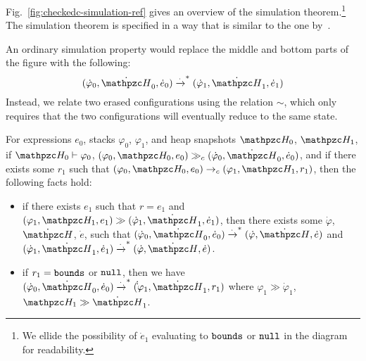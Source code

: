 Fig.~\ref{fig:checkedc-simulation-ref} gives an overview of 
the simulation theorem.\footnote{We ellide the  possibility of $\dot e_1$ evaluating to $\mathtt{bounds}$ or $\mathtt{null}$ in the diagram for readability.} The simulation theorem is specified in a way
that is similar to the one by~\citet{merigoux2021catala}.

An ordinary simulation property would
replace the middle and bottom parts of the figure with the
following: \[(\dot \varphi_0, \dot \heap_0, \dot e_0) 
  \xrightarrow{\cdot}^* (\dot \varphi_1, \dot \heap_1, \dot e_1)\]
Instead, we relate two erased configurations using the relation $\sim$,
which only requires that the two configurations will eventually reduce
to the same state.


\begin{thm}\label{simulation-thm}
For \lang expressions $e_0$, stacks $\varphi_0$, $\varphi_1$, and heap snapshots $\heap_0$, $\heap_1$, 
if $\heap_0 \vdash \varphi_0$, $(\varphi_0,\heap_0,e_0)\gg_c (\dot \varphi_0,\dot \heap_0, \dot e_0)$,
and if there exists some $r_1$ such that $(\varphi_0, \heap_0, e_0)
\rightarrow_c (\varphi_1, \heap_1, r_1)$, then the following facts hold:

\begin{itemize}

\item if there exists $e_1$ such that $r=e_1$ and $(\varphi_1, \heap_1, e_1) \gg (\dot \varphi_1, \dot \heap_1, \dot e_1)$, then there exists some $\dot \varphi$,$\dot \heap$, $\dot e$, such that
$(\dot \varphi_0, \dot \heap_0,\dot e_0) \xrightarrow{\cdot}^* (\dot
\varphi,\dot \heap,\dot e)$ and $(\dot
\varphi_1,\dot \heap_1,\dot e_1) \xrightarrow{\cdot}^* (\dot \varphi,
\dot \heap,\dot e)$.

\item if $r_1 = \mathtt{bounds}$ or $\mathtt{null}$, then we have $(\dot \varphi_0, \dot \heap_0,\dot e_0) \xrightarrow{\cdot}^* (\dot
\dot \varphi_1,\dot \heap_1, r_1)$ where $\varphi_1 \gg \dot
\varphi_1$, $\heap_1 \gg \dot \heap_1$.

\end{itemize}
\end{thm}


